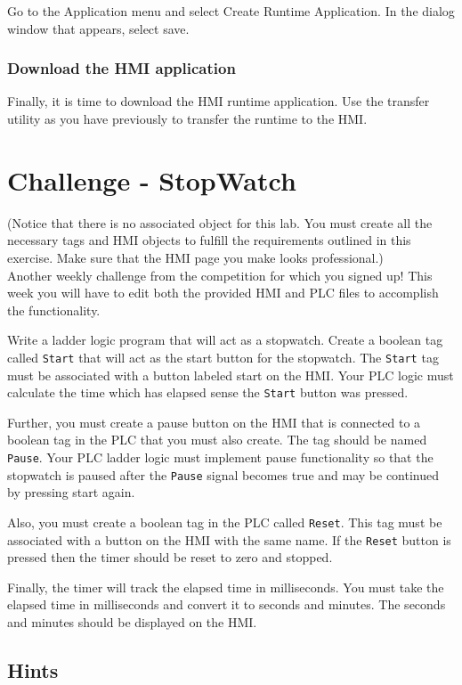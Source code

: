Go to the Application menu and select Create Runtime Application. In the dialog window that appears, select save. 

\subsubsection{Download the HMI application}
Finally, it is time to download the HMI runtime application. Use the transfer utility as you have previously to transfer the runtime to the HMI.



\section{Challenge - StopWatch}
(Notice that there is no associated object for this lab. You must create all the necessary tags and HMI objects to fulfill the requirements outlined in this exercise. Make sure that the HMI page you make looks professional.)
\\

Another weekly challenge from the competition for which you signed up! This week you will have to edit both the provided HMI and PLC files to accomplish the functionality.

Write a ladder logic program that will act as a stopwatch. Create a boolean tag called \verb|Start| that will act as the start button for the stopwatch. The \verb|Start| tag must be associated with a button labeled start on the HMI. Your PLC logic must calculate the time which has elapsed sense the \verb|Start| button was pressed. 

Further, you must create a pause button on the HMI that is connected to a boolean tag in the PLC that you must also create. The tag should be named \verb|Pause|. Your PLC ladder logic must implement pause functionality so that the stopwatch is paused after the \verb|Pause| signal becomes true and may be continued by pressing start again. 

Also, you must create a boolean tag in the PLC called \verb|Reset|. This tag must be associated with a button on the HMI with the same name. If the \verb|Reset| button is pressed then the timer should be reset to zero and stopped. 

Finally, the timer will track the elapsed time in milliseconds. You must take the elapsed time in milliseconds and convert it to seconds and minutes. The seconds and minutes should be displayed on the HMI.


\subsection{Hints}

